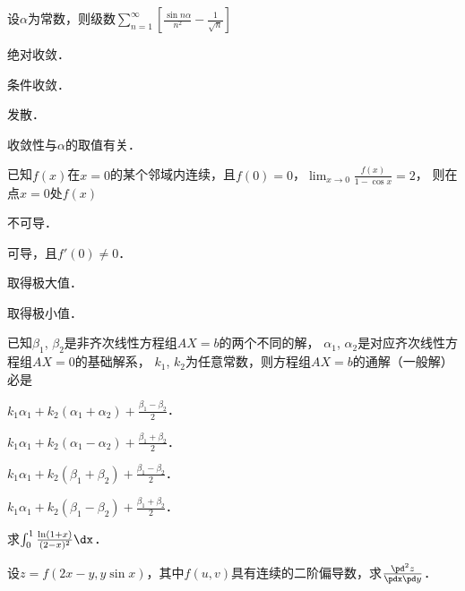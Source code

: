 \documentclass[plain,noanswer,medmath]{../../template/jnuexam}
\begin{document}
\begin{problem}
设$\alpha$为常数，则级数$\sum_{n=1}^{\infty}
\left[\frac{\sin n\alpha}{n^2}-\frac{1}{\sqrt{n}}\right]$\pickout{}
\begin{abcd}
\item 绝对收敛．
\item 条件收敛．
\item 发散．
\item 收敛性与$\alpha$的取值有关．
\end{abcd}
\end{problem}


\begin{problem}
已知$f(x)$在$x=0$的某个邻域内连续，且$f(0)=0$，$\lim_{x\to 0}\frac{f(x)}{1-\cos x}=2$，
则在点$x=0$处$f(x)$\pickout{}
\begin{abcd}
\item 不可导．
\item 可导，且$f'(0)\ne 0$．
\item 取得极大值．
\item 取得极小值．
\end{abcd}
\end{problem}


\begin{problem}
已知$\beta_1$, $\beta_2$是非齐次线性方程组$AX=b$的两个不同的解，
$\alpha_1$, $\alpha_2$是对应齐次线性方程组$AX=0$的基础解系，
$k_1$, $k_2$为任意常数，则方程组$AX=b$的通解（一般解）必是\pickout{}
\begin{abcd}
\item $k_1\alpha_1+ k_2(\alpha_1+\alpha_2) + \frac{\beta_1-\beta_2}{2}$．
\item $k_1\alpha_1+ k_2(\alpha_1-\alpha_2) + \frac{\beta_1+\beta_2}{2}$．
\item $k_1\alpha_1+ k_2(\beta_1+\beta_2) + \frac{\beta_1-\beta_2}{2}$．
\item $k_1\alpha_1+ k_2(\beta_1-\beta_2) + \frac{\beta_1+\beta_2}{2}$．
\end{abcd}
\end{problem}




\begin{problem}
求$\int_0^1\frac{\ln(1+x)}{(2-x)^2}\dx$．
\end{problem}


\begin{problem}
设$z=f(2x-y,y\sin x)$，其中$f(u,v)$具有连续的二阶偏导数，求$\frac{\pd^2z}{\pdx\pd y}$．
\end{problem}
\end{document}
